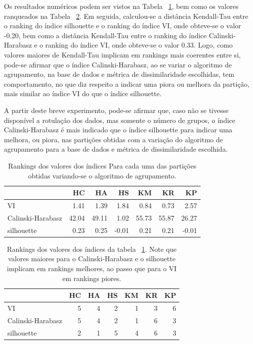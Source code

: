 Os resultados numéricos podem ser vistos na Tabela ~\ref{tbl:rankings_3}, bem como os valores ranqueados na Tabela ~\ref{tbl:rankings}. Em seguida, calculou-se a distância Kendall-Tau entre o ranking do índice silhouette e o ranking do índice VI, onde obteve-se o valor -0.20, bem como a distância Kendall-Tau entre o ranking do índice Calinski-Harabasz e o ranking do índice VI, onde obteve-se o valor 0.33. Logo, como valores maiores de Kendall-Tau implicam em rankings mais coerentes entre si, pode-se afirmar que o índice Calinski-Harabasz, ao se variar o algoritmo de agrupamento, na base de dados e métrica de dissimilaridade escolhidas, tem comportamento, no que diz respeito a indicar uma piora ou melhora da partição, mais similar ao índice VI do que o índice silhouette.

A partir deste breve experimento, pode-se afirmar que, caso não se tivesse disponível a rotulação dos dados, mas somente o número de grupos, o índice Calinski-Harabasz é mais indicado que o índice silhouette para indicar uma melhora, ou piora, nas partições obtidas com a variação do algoritmo de agrupamento para a base de dados e métrica de dissimilaridade escolhida.

	\begin{table}[]
		\centering
		\caption{Rankings dos valores dos índices Para cada uma das partições obtidas variando-se o algoritmo de agrupamento.} 	\label{tbl:rankings_3}
		\begin{tabular}{lrrrrrr}
			\toprule
			{} &          HC &          HA &         HS &          KM &          KR &          KP \\
			\midrule
			VI &   1.41 &   1.39 &  1.84 &   0.84 &   0.73 &   2.57 \\
			Calinski-Harabasz &  42.04 &  49.11 &  1.02 &  55.73 &  55.87 &  26.27 \\
			silhouette &   0.23 &   0.25 & -0.01 &   0.21 &   0.21 &  -0.01 \\
			\bottomrule
		\end{tabular}
			\end{table}

	\begin{table}[]
		\centering
		\caption{Rankings dos valores dos índices da tabela ~\ref{tbl:rankings_3}. Note que valores maiores para o Calinski-Harabasz e o silhouette implicam em rankings melhores, ao passo que para o VI em rankings piores.} 	\label{tbl:rankings}
		\begin{tabular}{lrrrrrr}
			\toprule
			{} &          HC &          HA &         HS &          KM &          KR &          KP \\			
			\midrule
			VI &  5 &  4 &  2 &  1 &  3 &  6 \\
			Calinski-Harabasz &  5 &  4 &  2 &  1 &  6 &  3 \\
			silhouette &  2 &  1 &  5 &  4 &  6 &  3 \\
			\bottomrule
		\end{tabular}
	\end{table}


